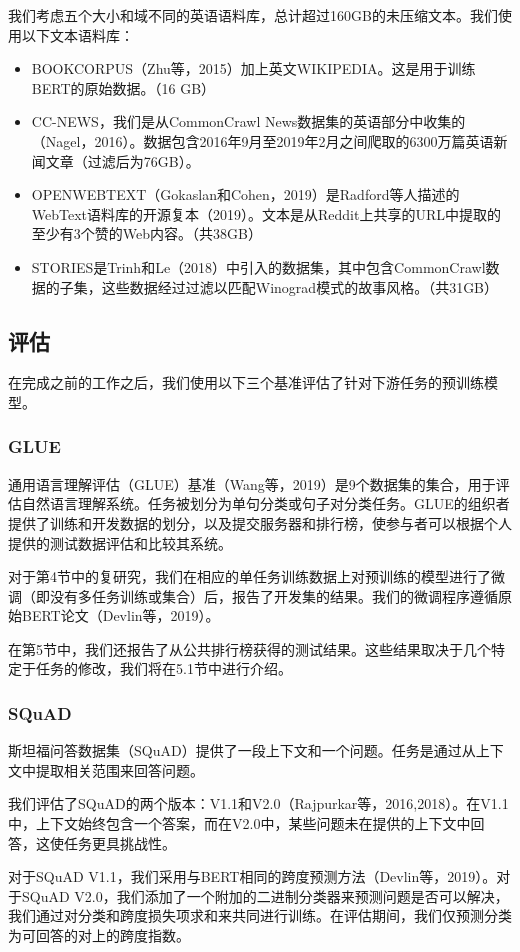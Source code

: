 \documentclass[lang=cn,11pt,a4paper,twocolumn]{elegantpaper}
\begin{document}
我们考虑五个大小和域不同的英语语料库，总计超过160GB的未压缩文本。我们使用以下文本语料库：
\begin{itemize}
  \item BOOKCORPUS（Zhu等，2015）加上英文WIKIPEDIA。这是用于训练BERT的原始数据。（16 GB）
  \item CC-NEWS，我们是从CommonCrawl News数据集的英语部分中收集的（Nagel，2016）。数据包含2016年9月至2019年2月之间爬取的6300万篇英语新闻文章（过滤后为76GB）。
  \item OPENWEBTEXT（Gokaslan和Cohen，2019）是Radford等人描述的WebText语料库的开源复本（2019）。文本是从Reddit上共享的URL中提取的至少有3个赞的Web内容。（共38GB）
  \item STORIES是Trinh和Le（2018）中引入的数据集，其中包含CommonCrawl数据的子集，这些数据经过过滤以匹配Winograd模式的故事风格。（共31GB）
\end{itemize}

\subsection{评估}
在完成之前的工作之后，我们使用以下三个基准评估了针对下游任务的预训练模型。
\subsubsection{GLUE}
通用语言理解评估（GLUE）基准（Wang等，2019）是9个数据集的集合，用于评估自然语言理解系统。任务被划分为单句分类或句子对分类任务。GLUE的组织者提供了训练和开发数据的划分，以及提交服务器和排行榜，使参与者可以根据个人提供的测试数据评估和比较其系统。

对于第4节中的复研究，我们在相应的单任务训练数据上对预训练的模型进行了微调（即没有多任务训练或集合）后，报告了开发集的结果。我们的微调程序遵循原始BERT论文（Devlin等，2019）。

在第5节中，我们还报告了从公共排行榜获得的测试结果。这些结果取决于几个特定于任务的修改，我们将在5.1节中进行介绍。
\subsubsection{SQuAD}
斯坦福问答数据集（SQuAD）提供了一段上下文和一个问题。任务是通过从上下文中提取相关范围来回答问题。

我们评估了SQuAD的两个版本：V1.1和V2.0（Rajpurkar等，2016,2018）。在V1.1中，上下文始终包含一个答案，而在V2.0中，某些问题未在提供的上下文中回答，这使任务更具挑战性。

对于SQuAD V1.1，我们采用与BERT相同的跨度预测方法（Devlin等，2019）。对于SQuAD V2.0，我们添加了一个附加的二进制分类器来预测问题是否可以解决，我们通过对分类和跨度损失项求和来共同进行训练。在评估期间，我们仅预测分类为可回答的对上的跨度指数。
\end{document}
